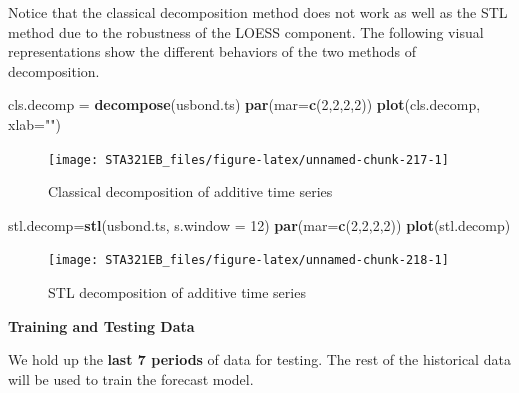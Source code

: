\documentclass[
]{book}
\newenvironment{Shaded}{\begin{snugshade}}{\end{snugshade}}
\newcommand{\AttributeTok}[1]{\textcolor[rgb]{0.13,0.29,0.53}{#1}}
\newcommand{\DecValTok}[1]{\textcolor[rgb]{0.00,0.00,0.81}{#1}}
\newcommand{\FunctionTok}[1]{\textcolor[rgb]{0.13,0.29,0.53}{\textbf{#1}}}
\newcommand{\NormalTok}[1]{#1}
\newcommand{\OtherTok}[1]{\textcolor[rgb]{0.56,0.35,0.01}{#1}}
\newcommand{\StringTok}[1]{\textcolor[rgb]{0.31,0.60,0.02}{#1}}
\begin{document}
Notice that the classical decomposition method does not work as well as the STL method due to the robustness of the LOESS component. The following visual representations show the different behaviors of the two methods of decomposition.

\begin{Shaded}
\begin{Highlighting}[]
\NormalTok{cls.decomp }\OtherTok{=} \FunctionTok{decompose}\NormalTok{(usbond.ts)}
\FunctionTok{par}\NormalTok{(}\AttributeTok{mar=}\FunctionTok{c}\NormalTok{(}\DecValTok{2}\NormalTok{,}\DecValTok{2}\NormalTok{,}\DecValTok{2}\NormalTok{,}\DecValTok{2}\NormalTok{))}
\FunctionTok{plot}\NormalTok{(cls.decomp, }\AttributeTok{xlab=}\StringTok{""}\NormalTok{)}
\end{Highlighting}
\end{Shaded}

\begin{figure}

{\centering \texttt{[image: STA321EB\_files/figure-latex/unnamed-chunk-217-1]} 

}

\caption{Classical decomposition of additive time series}\label{fig:unnamed-chunk-217}
\end{figure}

\begin{Shaded}
\begin{Highlighting}[]
\NormalTok{stl.decomp}\OtherTok{=}\FunctionTok{stl}\NormalTok{(usbond.ts, }\AttributeTok{s.window =} \DecValTok{12}\NormalTok{)}
\FunctionTok{par}\NormalTok{(}\AttributeTok{mar=}\FunctionTok{c}\NormalTok{(}\DecValTok{2}\NormalTok{,}\DecValTok{2}\NormalTok{,}\DecValTok{2}\NormalTok{,}\DecValTok{2}\NormalTok{))}
\FunctionTok{plot}\NormalTok{(stl.decomp)}
\end{Highlighting}
\end{Shaded}

\begin{figure}

{\centering \texttt{[image: STA321EB\_files/figure-latex/unnamed-chunk-218-1]} 

}

\caption{STL decomposition of additive time series}\label{fig:unnamed-chunk-218}
\end{figure}

\textbf{Training and Testing Data}

We hold up the \textbf{last 7 periods} of data for testing. The rest of the historical data will be used to train the forecast model.
\end{document}

